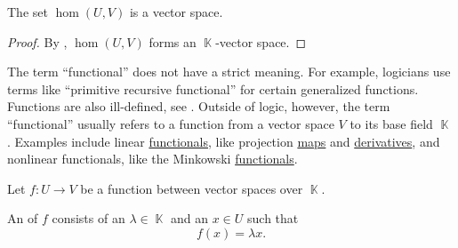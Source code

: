 \begin{proposition}\label{thm:linear_maps_form_algebra}
  The set \( \hom(U, V) \) is a vector space.
\end{proposition}
\begin{proof}
  By , \( \hom(U, V) \) forms an \( \BbbK \)-vector space.
\end{proof}

\begin{remark}\label{rem:functional}
  The term \enquote{functional} does not have a strict meaning. For example, logicians use terms like \enquote{primitive recursive functional} for certain generalized functions. Functions are also ill-defined, see . Outside of logic, however, the term \enquote{functional} usually refers to a function from a vector space \( V \) to its base field \( \BbbK \). Examples include linear \hyperref[def:semimodule/homomorphism]{functionals}, like projection \hyperref[def:module_basis_projection]{maps} and \hyperref[def:differentiability]{derivatives}, and nonlinear functionals, like the Minkowski \hyperref[def:minkowski_functional]{functionals}.
\end{remark}

\begin{definition}\label{def:eigenpair}
  Let \( f: U \to V \) be a function between vector spaces over \( \BbbK \).

  An  of \( f \) consists of an  \( \lambda \in \BbbK \) and an  \( x \in U \) such that
  \begin{equation*}
    f(x) = \lambda x.
  \end{equation*}
\end{definition}
